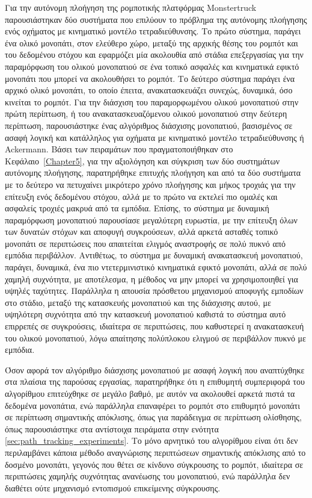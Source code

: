 \bigskip
Για την αυτόνομη πλοήγηση της ρομποτικής πλατφόρμας Monstertruck παρουσιάστηκαν δύο συστήματα που επιλύουν το πρόβλημα της αυτόνομης πλοήγησης ενός οχήματος με κινηματικό μοντέλο τετραδιεύθυνσης. Το πρώτο σύστημα, παράγει ένα ολικό μονοπάτι, στον ελεύθερο χώρο, μεταξύ της αρχικής θέσης του ρομπότ και του δεδομένου στόχου και εφαρμόζει μία ακολουθία από στάδια επεξεργασίας για την παραμόρφωση του ολικού μονοπατιού σε ένα τοπικό ασφαλές και κινηματικά εφικτό μονοπάτι που μπορεί να ακολουθήσει το ρομπότ. Το δεύτερο σύστημα παράγει ένα αρχικό ολικό μονοπάτι, το οποίο έπειτα, ανακατασκευάζει συνεχώς, δυναμικά, όσο κινείται το ρομπότ. Για την διάσχιση του παραμορφωμένου ολικού μονοπατιού στην πρώτη περίπτωση, ή του ανακατασκευαζόμενου ολικού μονοπατιού στην δεύτερη περίπτωση, παρουσιάστηκε ένας αλγόριθμος διάσχισης μονοπατιού, βασισμένος σε ασαφή λογική και κατάλληλος για οχήματα με κινηματικό μοντέλο τετραδιεύθυνσης ή Ackermann. Βάσει των πειραμάτων που πραγματοποιήθηκαν στο Κεφάλαιο~\ref{Chapter5}, για την αξιολόγηση και σύγκριση των δύο συστημάτων αυτόνομης πλοήγησης, παρατηρήθηκε επιτυχής πλοήγηση και από τα δύο συστήματα με το δεύτερο να πετυχαίνει μικρότερο χρόνο πλοήγησης και μήκος τροχιάς για την επίτευξη ενός δεδομένου στόχου, αλλά με το πρώτο να εκτελεί πιο ομαλές και ασφαλείς τροχιές μακρυά από τα εμπόδια. Επίσης, το σύστημα με δυναμική παραμόρφωση μονοπατιού παρουσίασε μεγαλύτερη ευρωστία, με την επίτευξη όλων των δυνατών στόχων και αποφυγή συγκρούσεων, αλλά αρκετά ασταθές τοπικό μονοπάτι σε περιπτώσεις που απαιτείται ελιγμός αναστροφής σε πολύ πυκνό από εμπόδια περιβάλλον. Αντιθέτως, το σύστημα με δυναμική ανακατασκευή μονοπατιού, παράγει, δυναμικά, ένα πιο ντετερμινιστικό κινηματικά εφικτό μονοπάτι, αλλά σε πολύ χαμηλή συχνότητα, με αποτέλεσμα, η μέθοδος να μην μπορεί να χρησιμοποιηθεί για υψηλές ταχύτητες. Παράλληλα η απουσία πρόσθετου μηχανισμού αποφυγής εμποδίων στο στάδιο, μεταξύ της κατασκευής μονοπατιού και της διάσχισης αυτού, με υψηλότερη συχνότητα από την κατασκευή μονοπατιού καθιστά το σύστημα αυτό επιρρεπές σε συγκρούσεις, ιδιαίτερα σε περιπτώσεις, που καθυστερεί η ανακατασκευή του ολικού μονοπατιού, λόγω απαίτησης πολύπλοκου ελιγμού σε περιβάλλον πυκνό με εμπόδια.

\bigskip
Όσον αφορά τον αλγόριθμο διάσχισης μονοπατιού με ασαφή λογική που αναπτύχθηκε στα πλαίσια της παρούσας εργασίας, παρατηρήθηκε ότι η επιθυμητή συμπεριφορά του αλγορίθμου επιτεύχθηκε σε μεγάλο βαθμό, με αυτόν να ακολουθεί αρκετά πιστά τα δεδομένα μονοπάτια, ενώ παράλληλα επαναφέρει το ρομπότ στο επιθυμητό μονοπάτι σε περίπτωση σημαντικής απόκλισης, όπως για παράδειγμα σε περίπτωση ολίσθησης, όπως παρουσιάστηκε στα αντίστοιχα πειράματα στην ενότητα \ref{sec:path_tracking_experiments}. Το μόνο αρνητικό του αλγορίθμου είναι ότι δεν περιλαμβάνει κάποια μέθοδο αναγνώρισης περιπτώσεων σημαντικής απόκλισης από το δοσμένο μονοπάτι, γεγονός που θέτει σε κίνδυνο σύγκρουσης το ρομπότ, ιδιαίτερα σε περιπτώσεις χαμηλής συχνότητας ανανέωσης του μονοπατιού, ενώ παράλληλα δεν διαθέτει ούτε μηχανισμό εντοπισμού επικείμενης σύγκρουσης.

